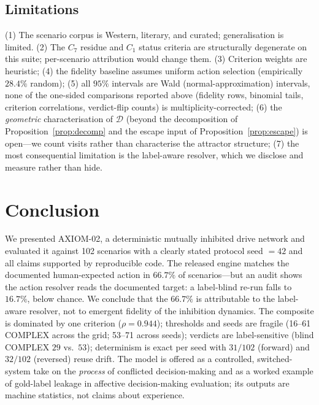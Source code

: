 \documentclass[journal]{IEEEtran}
\newcommand{\DD}{\mathcal{D}}
\newcommand{\pct}{\%}
\begin{document}
\subsection{Limitations}
(1) The scenario corpus is Western, literary, and curated; generalisation
is limited. (2) The $C_7$ residue and $C_1$ status criteria are
structurally degenerate on this suite; per-scenario attribution would
change them. (3) Criterion weights are heuristic; (4) the fidelity
baseline assumes uniform action selection (empirically $28.4\pct$
random); (5) all $95\pct$ intervals are Wald (normal-approximation)
intervals, none of the one-sided comparisons reported above
(fidelity rows, binomial tails, criterion correlations,
verdict-flip counts) is multiplicity-corrected; (6) the
\emph{geometric} characterisation of $\DD$ (beyond the
decomposition of Proposition~\ref{prop:decomp} and the escape input of
Proposition~\ref{prop:escape}) is open---we count visits rather than
characterise the attractor structure; (7) the most consequential
limitation is the label-aware resolver, which we disclose and measure
rather than hide.


\section{Conclusion}
\label{sec:conclusion}

We presented AXIOM-02, a deterministic mutually inhibited drive network
and evaluated it against 102 scenarios with a clearly stated protocol
seed $=42$ and all claims supported by reproducible code. The released
engine matches the documented human-expected action in $66.7\pct$ of
scenarios---but an audit shows the action resolver reads the documented
target: a label-blind re-run falls to $16.7\pct$, below chance. We conclude
that the $66.7\pct$ is attributable to the label-aware resolver, not to
emergent fidelity of the inhibition dynamics. The composite is
dominated by one criterion ($\rho=0.944$); thresholds and seeds are
fragile (16--61 COMPLEX across the grid; 53--71 across seeds); verdicts
are label-sensitive (blind COMPLEX $29$ vs.\ $53$); determinism is exact
per seed with $31/102$ (forward) and $32/102$ (reversed) reuse drift.
The model is offered as a controlled, switched-system take on the
\emph{process} of conflicted decision-making and as a worked example of
gold-label leakage in affective decision-making evaluation; its outputs
are machine statistics, not claims about experience.
\end{document}
